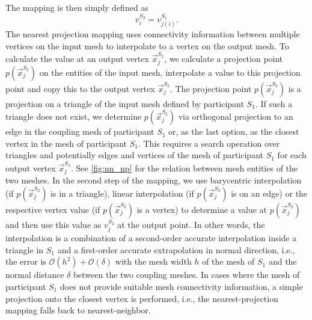 The mapping is then simply defined as
\[ v_{i}^{S_2} = v_{j(i)}^{S_1}. \] 
%
The nearest projection mapping uses connectivity information between multiple vertices on the input mesh to interpolate to a vertex on the output mesh. To calculate the value at an output vertex $\vec{x}_j^{S_2}$, we calculate a projection point $p(\vec{x}_j^{S_2})$ on the entities of the input mesh, interpolate a value to this projection point and copy this to the output vertex $\vec{x}_j^{S_2}$. The projection point $p(\vec{x}_j^{S_2})$ is a projection on a triangle of the input mesh defined by participant ${S_1}$. If such a triangle does not exist, we determine $p(\vec{x}_j^{S_2})$ via orthogonal projection to an edge in the coupling mesh of participant ${S_1}$ or, as the last option, as the closest vertex in the mesh of participant ${S_1}$. This requires a search operation over triangles and potentially edges and vertices of the mesh of participant ${S_1}$ for each output vertex $\vec{x}_j^{S_2}$. See \autoref{fig:nn_np} for the relation between mesh entities of the two meshes. In the second step of the mapping, we use barycentric interpolation (if $p(\vec{x}_j^{S_2})$ is in a triangle), linear interpolation (if $p(\vec{x}_j^{S_2})$ is on an edge) or the respective vertex value (if $p(\vec{x}_j^{S_2})$ is a vertex) to determine a value at $p(\vec{x}_j^{S_2})$ and then use this value as $v_j^{S_2}$ at the output point. In other words, the interpolation is a combination of a second-order accurate interpolation inside a triangle in $S_1$ and a first-order accurate extrapolation in normal direction, i.e., the error is $\mathcal{O}(h^2) + \mathcal{O}(\delta)$ with the mesh width $h$ of the mesh of $S_1$ and the normal distance $\delta$ between the two coupling meshes.  
In cases where the mesh of participant ${S_1}$ does not provide suitable mesh connectivity information, a simple projection onto the closest vertex is performed, i.e., the nearest-projection mapping falls back to nearest-neighbor.

